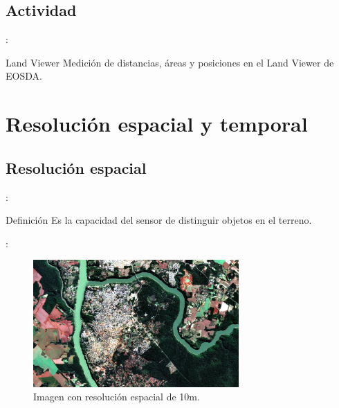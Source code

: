 \documentclass[handout,aspectratio=169]{beamer}
\begin{document}
\subsection{Actividad}

\begin{frame}{\secname : \subsecname}
    \begin{alertblock}{Land Viewer}
        Medición de distancias, áreas y posiciones en el Land Viewer de EOSDA.
    \end{alertblock}
\end{frame}


\section{Resolución espacial y temporal}
\subsection{Resolución espacial}
\begin{frame}{\secname : \subsecname}
    \begin{block}{Definición}
        Es la capacidad del sensor de distinguir objetos en el terreno.
    \end{block}
\end{frame}

\begin{frame}{\secname : \subsecname}
    \begin{figure}[h!]
        \centering
        \includegraphics[width=0.7\textwidth]{fig:10m.jpg}
        \caption{Imagen con resolución espacial de 10m.}
    \end{figure}
\end{frame}
\end{document}
